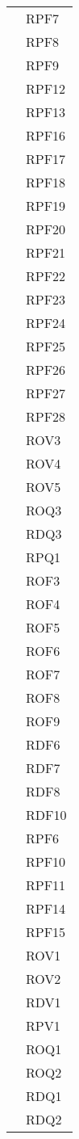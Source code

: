 \begin{longtable}{| p{5cm} | p{5cm} |}
				&	RPF7 \\
				&	RPF8 \\
				&	RPF9 \\
				&	RPF12 \\
				&	RPF13 \\
				&	RPF16 \\
				&	RPF17 \\
				&	RPF18 \\
				&	RPF19 \\
				&	RPF20 \\
				&	RPF21 \\
				&	RPF22 \\
				&	RPF23 \\
				&	RPF24 \\
				&	RPF25\\
				&	RPF26 \\
				&	RPF27 \\
				& 	RPF28 \\
				&	ROV3 \\
				&	ROV4 \\
				&	ROV5 \\
				&	ROQ3 \\
				&	RDQ3 \\
				&	RPQ1 \\
				 \hline
					
		\rowcolor{LightGray}
		\multirow[t]{23}{*}{\cellcolor{LightGray}}{Capitolato} 
				 & ROF3 \\
				\rowcolor{LightGray} &	ROF4 \\
				\rowcolor{LightGray} &	ROF5 \\
				\rowcolor{LightGray} &	ROF6 \\
				\rowcolor{LightGray} &	ROF7 \\
				\rowcolor{LightGray} &	ROF8 \\
				\rowcolor{LightGray} &	ROF9 \\
				\rowcolor{LightGray} &	RDF6 \\
				\rowcolor{LightGray} &	RDF7 \\
				\rowcolor{LightGray} &	RDF8 \\
				\rowcolor{LightGray} &	RDF10 \\
				\rowcolor{LightGray} &	RPF6 \\
				\rowcolor{LightGray} &	RPF10 \\
				\rowcolor{LightGray} &	RPF11 \\
				\rowcolor{LightGray} &	RPF14 \\
				\rowcolor{LightGray} &	RPF15 \\
				\rowcolor{LightGray} &	ROV1 \\
				\rowcolor{LightGray} &	ROV2 \\
				\rowcolor{LightGray} &	RDV1 \\
				\rowcolor{LightGray} &	RPV1 \\
				\rowcolor{LightGray} &	ROQ1 \\
				\rowcolor{LightGray} &	ROQ2\\
				\rowcolor{LightGray} &	RDQ1\\
				\rowcolor{LightGray} &	RDQ2 \\
		

\end{longtable}
